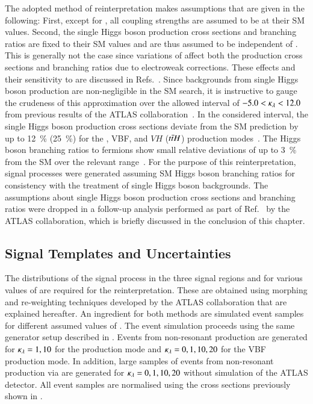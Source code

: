 The adopted method of reinterpretation makes assumptions that are given in the
following: First, except for \klambda, all coupling strengths are assumed to be
at their SM values. Second, the single Higgs boson production cross sections and
branching ratios are fixed to their SM values and are thus assumed to be
independent of \klambda. This is generally not the case since variations of
\klambda affect both the production cross sections and branching ratios due to
electroweak corrections. These effects and their sensitivity to \klambda are
discussed in
Refs.~\cite{ATL-PHYS-PUB-2019-009,Degrassi:2016wml,Maltoni:2017ims}.  Since
backgrounds from single Higgs boson production are non-negligible in the SM \HH
search, it is instructive to gauge the crudeness of this approximation over the
allowed interval of $-5.0 < \kappa_{\lambda} < 12.0$ from previous results of the ATLAS
collaboration~\cite{HDBS-2018-58}. In the considered \klambda interval, the
single Higgs boson production cross sections deviate from the SM prediction by
up to \SI{12}{\percent} (\SI{25}{\percent}) for the \ggF, VBF, and $VH$
($t\bar{t} H$) production modes~\cite{ATL-PHYS-PUB-2019-009}. The Higgs boson
branching ratios to fermions show small relative deviations of up to
\SI{3}{\percent} from the SM over the relevant \klambda
range~\cite{ATL-PHYS-PUB-2019-009}. For the purpose of this reinterpretation,
signal processes were generated assuming SM Higgs boson branching ratios for
consistency with the treatment of single Higgs boson backgrounds. The
assumptions about single Higgs boson production cross sections and branching
ratios were dropped in a follow-up analysis performed as part of
Ref.~\cite{HDBS-2022-03} by the ATLAS collaboration, which is briefly discussed
in the conclusion of this chapter.


\subsection{Signal Templates and Uncertainties}%
\label{sec:self_coupling_signals}

The distributions of the signal process in the three signal regions
and for various values of \klambda are required for the
reinterpretation.
These are obtained using morphing and re-weighting techniques
developed by the ATLAS collaboration that are explained hereafter. An
ingredient for both methods are simulated event samples for different
assumed values of \klambda. The event simulation proceeds using the
same generator setup described in
. Events from non-resonant \HH
production are generated for $\kappa_{\lambda} = 1, 10$ for the \ggF
production mode and $\kappa_{\lambda} = 0, 1, 10, 20$ for the VBF production
mode. In addition, large samples of events from non-resonant \HH
production via \ggF are generated for $\kappa_{\lambda} = 0, 1, 10, 20$
without simulation of the ATLAS detector. All event samples are
normalised using the cross sections previously shown in
.

